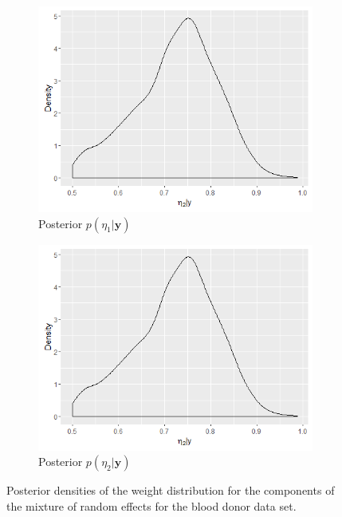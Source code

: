 \begin{figure}[!htb]
\centering
\captionsetup{justification=centering}
\begin{subfigure}[b]{0.4\textwidth}
		\includegraphics[width=\textwidth]{mainmatter/chapter_6_blood_donor/eta1.png}
        \caption{\label{fig : eta_blood_donor_1} Posterior $p(\eta_1|\boldsymbol{y})$}
	\end{subfigure}
	\begin{subfigure}[b]{0.4\textwidth}
		\includegraphics[width=\textwidth]{mainmatter/chapter_6_blood_donor/eta2.png}	
          \caption{\label{fig : eta_blood_donor_2}Posterior $p(\eta_2|\boldsymbol{y})$}
	\end{subfigure}	
	\caption{Posterior densities of the weight distribution for the components of the mixture of random effects for the blood donor data set.}
	\label{fig : eta_blood_donor}    
\end{figure} 

